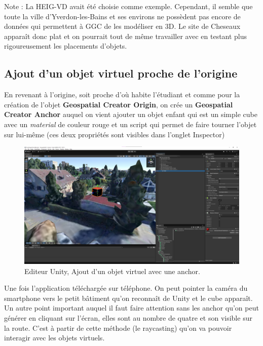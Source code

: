 Note : La HEIG-VD avait été choisie comme exemple. Cependant, il semble que toute la ville d'Yverdon-les-Bains et ses environs ne possèdent pas encore
de données qui permettent à GGC de les modéliser en 3D. Le site de Cheseaux apparaît donc plat et on pourrait tout de même travailler avec
en testant plus rigoureusement les placements d'objets.

\subsection{Ajout d'un objet virtuel proche de l'origine}
En revenant à l'origine, soit proche d'où habite l'étudiant et comme pour la création de l'objet \textbf{Geospatial Creator Origin}, on crée un \textbf{Geospatial Creator Anchor} auquel on vient ajouter un objet enfant
qui est un simple cube avec un \textit{material} de couleur rouge et un script  qui permet de faire tourner l'objet sur lui-même (ces deux propriétés sont visibles dans l'onglet Inspector)

\begin{figure}[H]
    \centering
    \includegraphics[width=1\linewidth]{assets/figures/Screenshots/GGC_3.png}
    \caption{Editeur Unity, Ajout d'un objet virtuel avec une anchor.}
    \label{fig:GGC_3}
\end{figure}
Une fois l'application téléchargée sur téléphone. On peut pointer la caméra du smartphone vers le petit bâtiment qu'on reconnaît de Unity et le cube apparaît.
Un autre point important auquel il faut faire attention sans les anchor qu'on peut générer en cliquant sur l'écran, elles sont au nombre de quatre et son visible sur la route. C'est à partir de cette méthode (le raycasting)
qu'on va pouvoir interagir avec les objets virtuels.

